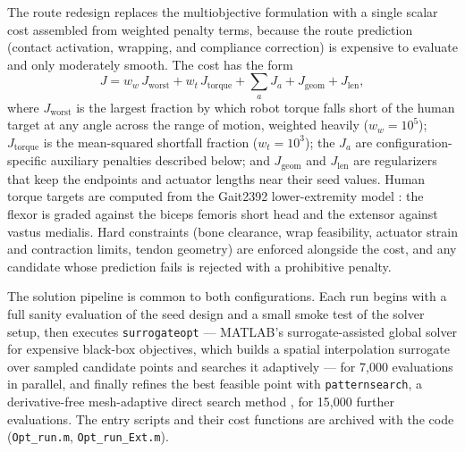 The route redesign replaces the multiobjective formulation with a single scalar cost assembled from weighted penalty terms, because the route prediction (contact activation, wrapping, and compliance correction) is expensive to evaluate and only moderately smooth. The cost has the form
\begin{equation}
    J = w_{w}\,J_{\text{worst}} + w_{t}\,J_{\text{torque}} + \textstyle\sum_{a} J_{a} + J_{\text{geom}} + J_{\text{len}},
    \label{eq:opt_cost}
\end{equation}
where $J_{\text{worst}}$ is the largest fraction by which robot torque falls short of the human target at any angle across the range of motion, weighted heavily ($w_{w} = 10^{5}$); $J_{\text{torque}}$ is the mean-squared shortfall fraction ($w_{t} = 10^{3}$); the $J_{a}$ are configuration-specific auxiliary penalties described below; and $J_{\text{geom}}$ and $J_{\text{len}}$ are regularizers that keep the endpoints and actuator lengths near their seed values. Human torque targets are computed from the Gait2392 lower-extremity model \citep{delp_opensim_2007, seth_opensim_2018}: the flexor is graded against the biceps femoris short head and the extensor against vastus medialis. Hard constraints (bone clearance, wrap feasibility, actuator strain and contraction limits, tendon geometry) are enforced alongside the cost, and any candidate whose prediction fails is rejected with a prohibitive penalty.

The solution pipeline is common to both configurations. Each run begins with a full sanity evaluation of the seed design and a small smoke test of the solver setup, then executes \texttt{surrogateopt} --- MATLAB's surrogate-assisted global solver for expensive black-box objectives, which builds a spatial interpolation surrogate over sampled candidate points and searches it adaptively \citep{mathworks_optimization_2025} --- for 7,000 evaluations in parallel, and finally refines the best feasible point with \texttt{patternsearch}, a derivative-free mesh-adaptive direct search method \citep{audet_mads_2006, mathworks_optimization_2025}, for 15,000 further evaluations. The entry scripts and their cost functions are archived with the code (\texttt{Opt\_run.m}, \texttt{Opt\_run\_Ext.m}).

